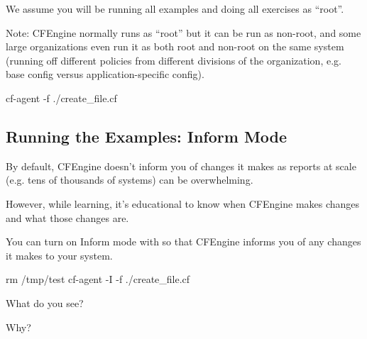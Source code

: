 We assume you will be running all examples and doing all exercises as
``root''.

Note: CFEngine normally runs as ``root'' but it can be run as non-root, and
some large organizations even run it as both root and non-root on
the same system (running off different policies from different divisions 
of the organization, e.g. base config versus application-specific
config).





\begin{aside}
\label{aside:exercise_4}

\begin{code}
cf-agent -f ./create_file.cf
\end{code}

\end{aside}





\subsection{Running the Examples: Inform Mode}

By default, CFEngine doesn't inform you of changes it makes as reports
at scale (e.g. tens of thousands of systems) can be overwhelming.

However, while learning, it's educational to know when CFEngine makes
changes and what those changes are.

You can turn on Inform mode with  so that CFEngine informs
you of any changes it makes to your system.





\begin{aside}
\label{aside:exercise_5}

\begin{code}
rm /tmp/test
cf-agent -I -f ./create_file.cf
\end{code}

What do you see?

Why?

\end{aside}





